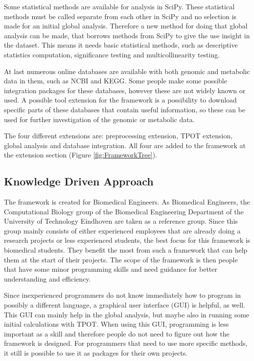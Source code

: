 \documentclass[10pt,a4paper]{article}
\begin{document}
	Some statistical methods are available for analysis in SciPy. These statistical methods must be called separate from each other in SciPy and no selection is made for an initial global analysis. Therefore a new method for doing that global analysis can be made, that borrows methods from SciPy to give the use insight in the dataset. This means it needs basic statistical methods, such as descriptive statistics computation, significance testing and multicollinearity testing. 
	
	At last numerous online databases are available with both genomic and metabolic data in them, such as NCBI and KEGG. Some people make some possible integration packages for these databases, however these are not widely known or used. A possible tool extension for the framework is a possibility to download specific parts of these databases that contain useful information, so these can be used for further investigation of the genomic or metabolic data.
	
	The four different extensions are: preprocessing extension, TPOT extension, global analysis and database integration. All four are added to the framework at the extension section (Figure \ref{fig:FrameworkTree}).
	
	\subsection{Knowledge Driven Approach}
	\label{subsec:KnowledgeDrivenApproach}
	
	The framework is created for Biomedical Engineers. As Biomedical Engineers, the Computational Biology group of the Biomedical Engineering Department of the University of Technology Eindhoven are taken as a reference group. Since this group mainly consists of either experienced employees that are already doing a research projects or less experienced students, the best focus for this framework is biomedical students. They benefit the most from such a framework that can help them at the start of their projects. The scope of the framework is then people that have some minor programming skills and need guidance for better understanding and efficiency.
	
	Since inexperienced programmers do not know immediately how to program in possibly a different language, a graphical user interface (GUI) is helpful, as well. This GUI can mainly help in the global analysis, but maybe also in running some initial calculations with TPOT. When using this GUI, programming is less important as a skill and therefore people do not need to figure out how the framework is designed. For programmers that need to use more specific methods, it still is possible to use it as packages for their own projects.
	
\end{document}
